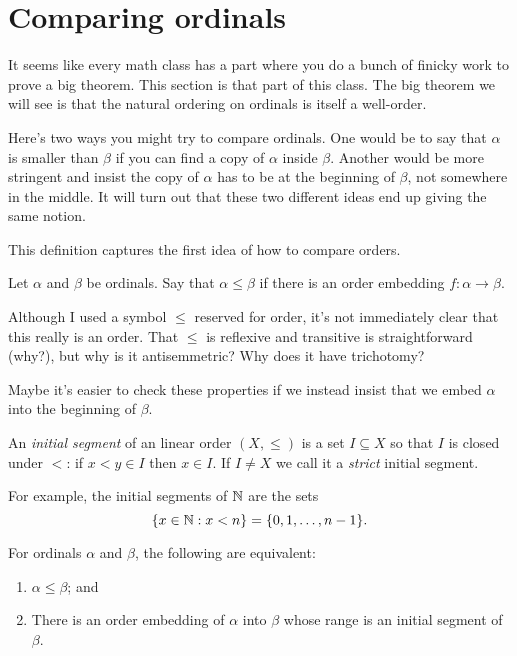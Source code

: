 \documentclass[10pt]{amsart}
\begin{document}
\newpage

\section{Comparing ordinals}

It seems like every math class has a part where you do a bunch of finicky work to prove a big theorem. This section is that part of this class. The big theorem we will see is that the natural ordering on ordinals is itself a well-order.

Here's two ways you might try to compare ordinals. One would be to say that $\alpha$ is smaller than $\beta$ if you can find a copy of $\alpha$ inside $\beta$. Another would be more stringent and insist the copy of $\alpha$ has to be at the beginning of $\beta$, not somewhere in the middle. It will turn out that these two different ideas end up giving the same notion.

This definition captures the first idea of how to compare orders.

\begin{definition}
Let $\alpha$ and $\beta$ be ordinals. Say that $\alpha \le \beta$ if there is an order embedding $f : \alpha \to \beta$. 
\end{definition}

Although I used a symbol $\le$ reserved for order, it's not immediately clear that this really is an order. That $\le$ is reflexive and transitive is straightforward (why?), but why is it antisemmetric? Why does it have trichotomy? 

Maybe it's easier to check these properties if we instead insist that we embed $\alpha$ into the beginning of $\beta$. 

\begin{definition}
An \emph{initial segment} of an linear order $(X,\le)$ is a set $I \subseteq X$ so that $I$ is closed under $<$: if $x < y \in I$ then $x \in I$. If $I \ne X$ we call it a \emph{strict} initial segment.
\end{definition}

For example, the initial segments of $\mathbb{N}$ are the sets
\[
\{x \in \mathbb{N} : x < n\} = \{0,1,\ldots,n-1\}.
\]

\begin{lemma}
For ordinals $\alpha$ and $\beta$, the following are equivalent:
\begin{enumerate}
\item $\alpha \le \beta$; and
\item There is an order embedding of $\alpha$ into $\beta$ whose range is an initial segment of $\beta$. 
\end{enumerate}
\end{lemma}
\end{document}
